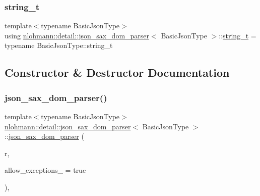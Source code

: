 \subsubsection{\texorpdfstring{string\_t}{string\_t}}
{\footnotesize\ttfamily template$<$typename Basic\+Json\+Type$>$ \\
using \mbox{\hyperlink{classnlohmann_1_1detail_1_1json__sax__dom__parser}{nlohmann\+::detail\+::json\+\_\+sax\+\_\+dom\+\_\+parser}}$<$ Basic\+Json\+Type $>$\+::\mbox{\hyperlink{classnlohmann_1_1detail_1_1json__sax__dom__parser_afd4d961ab2a6b01cbe6e840f7fb90cdc}{string\+\_\+t}} =  typename Basic\+Json\+Type\+::string\+\_\+t}



\subsection{Constructor \& Destructor Documentation}
\mbox{\label{classnlohmann_1_1detail_1_1json__sax__dom__parser_afc50fee0a92ce84afb84041ebbdfba80}} 
\subsubsection{\texorpdfstring{json\_sax\_dom\_parser()}{json\_sax\_dom\_parser()}\hspace{0.1cm}{\footnotesize\ttfamily [1/3]}}
{\footnotesize\ttfamily template$<$typename Basic\+Json\+Type$>$ \\
\mbox{\hyperlink{classnlohmann_1_1detail_1_1json__sax__dom__parser}{nlohmann\+::detail\+::json\+\_\+sax\+\_\+dom\+\_\+parser}}$<$ Basic\+Json\+Type $>$\+::\mbox{\hyperlink{classnlohmann_1_1detail_1_1json__sax__dom__parser}{json\+\_\+sax\+\_\+dom\+\_\+parser}} (\begin{DoxyParamCaption}\item[{Basic\+Json\+Type \&}]{r,  }\item[{const bool}]{allow\+\_\+exceptions\+\_\+ = {\ttfamily true} }\end{DoxyParamCaption})\hspace{0.3cm}{\ttfamily [inline]}, {\ttfamily [explicit]}}


